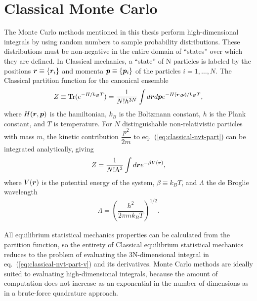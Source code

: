 \section{Classical Monte Carlo}
The Monte Carlo methods mentioned in this thesis perform high-dimensional integrals by using random numbers to sample probability distributions. These distributions must be non-negative in the entire domain of ``states'' over which they are defined. In Classical mechanics, a ``state'' of N particles is labeled by the positions $\boldsymbol{r}\equiv\{\boldsymbol{r}_i\}$ and momenta $\boldsymbol{p}\equiv\{\boldsymbol{p}_i\}$ of the particles $i=1,\dots,N$. The Classical partition function for the canonical ensemble
\begin{align} \label{eq:classical-nvt-part}
Z \equiv \text{Tr}(e^{-H/k_BT}) = \dfrac{1}{N!h^{3N}} \int d\boldsymbol{r} d\boldsymbol{p} e^{-H(\boldsymbol{r}, \boldsymbol{p})/k_BT},
\end{align}
where $H(\boldsymbol{r}, \boldsymbol{p})$ is the hamiltonian, $k_B$ is the Boltzmann constant, $h$ is the Plank constant, and $T$ is temperature. For $N$ distinguishable non-relativistic particles with mass $m$, the kinetic contribution $\dfrac{p^2}{2m}$ to eq.~(\ref{eq:classical-nvt-part}) can be integrated analytically, giving
\begin{align}\label{eq:classical-nvt-part-v}
Z = \dfrac{1}{N!\Lambda^{3}} \int d\boldsymbol{r} e^{-\beta V(\boldsymbol{r})},
\end{align}
where $V(\boldsymbol{r})$ is the potential energy of the system, $\beta\equiv k_BT$, and $\Lambda$ the de Broglie wavelength
\begin{align} \label{eq:debroglie}
\Lambda = \left(
\dfrac{h^2}{2\pi mk_BT}
\right)^{1/2}.
\end{align}

All equilibrium statistical mechanics properties can be calculated from the partition function, so the entirety of Classical equilibrium statistical mechanics reduces to the problem of evaluating the 3N-dimensional integral in eq.~(\ref{eq:classical-nvt-part-v}) and its derivatives. Monte Carlo methods are ideally suited to evaluating high-dimensional integrals, because the amount of computation does not increase as an exponential in the number of dimensions as in a brute-force quadrature approach.

